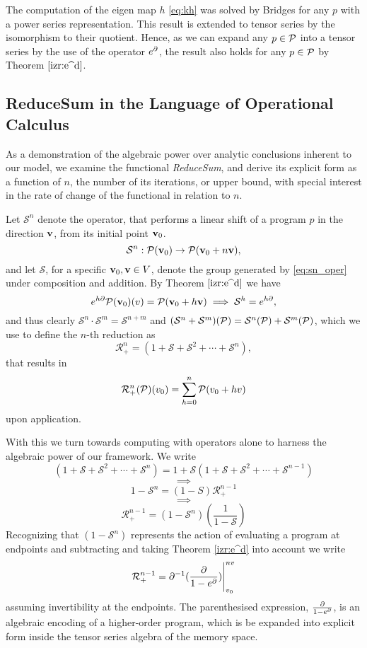 The computation of the eigen map $h$ \eqref{eq:kh} was solved by Bridges \cite{bridges2016solution} for any $p$ with a power series representation. This result is extended to tensor series by the isomorphism to their quotient. Hence, as we can expand any $p\in\mathcal{P}$ into a tensor series by the use of the operator $e^\partial$, the result also holds for any $p\in\mathcal{P}$ by Theorem $\ref{izr:e^d}$. 


\subsection{ReduceSum in the Language of Operational Calculus}

As a demonstration of the algebraic power over analytic conclusions inherent to our model, we examine the functional \emph{ReduceSum}, and derive its explicit form as a function of $n$, the number of its iterations, or upper bound, with special interest in the rate of change of the functional in relation to $n$. 

Let $\mathcal{S}^n$ denote the operator, that performs a linear shift of a program $p$ in the direction $\mathbf{v}$, from its initial point $\mathbf{v}_0$.
   \begin{equation}\label{eq:sn_oper}
   \mathcal{S}^n:\mathcal{P}(\mathbf{v}_0)\to \mathcal{P}(\mathbf{v}_0+n\mathbf{v}),
   \end{equation}  
and let $\mathcal{S}$, for a specific $\mathbf{v}_0, \mathbf{v}\in V$, denote the group generated by \eqref{eq:sn_oper} under composition and addition. By Theorem $\ref{izr:e^d}$ we have
   $$e^{h\partial}\mathcal{P}(\mathbf{v}_0)(v)=\mathcal{P}(\mathbf{v}_0+h\mathbf{v})\implies \mathcal{S}^h=e^{h\partial},$$
and thus clearly $\mathcal{S}^n\cdot\mathcal{S}^m=\mathcal{S}^{n+m}$ and $(\mathcal{S}^n+\mathcal{S}^m)(\mathcal{P})=\mathcal{S}^n(\mathcal{P})+\mathcal{S}^m(\mathcal{P})$, which we use to define the $n$-th reduction as
$$\mathcal{R}_+^n=(1+\mathcal{S}+\mathcal{S}^2+\cdots+\mathcal{S}^n),$$
that results in
   $$\mathcal{R}^n_+(\mathcal{P})(v_0)=\sum\limits_{h=0}^{n}\mathcal{P}(v_0+hv)$$
upon application.

With this we turn towards computing with operators alone to harness the algebraic power of our framework. We write
$$(1+\mathcal{S}+\mathcal{S}^2+\cdots+\mathcal{S}^n)=1+\mathcal{S}(1+\mathcal{S}+\mathcal{S}^2+\cdots+\mathcal{S}^{n-1})$$
   $$\implies$$
   $$1-\mathcal{S}^n=(1-S)\mathcal{R}^{n-1}_+$$
   $$\implies$$
   $$\mathcal{R}^{n-1}_+=(1-\mathcal{S}^n)(\frac{1}{1-\mathcal{S}})$$
Recognizing that $(1-\mathcal{S}^n)$ represents the action of evaluating a program at endpoints and subtracting and taking Theorem \ref{izr:e^d} into account we write
  \begin{equation}
    \mathcal{R}^{n-1}_+=\partial^{-1}(\frac{\partial}{1-e^\partial})\Bigg\vert_{v_0}^{nv}
  \end{equation}
assuming invertibility at the endpoints. The parenthesised expression, $\frac{\partial}{1-e^\partial}$, is an algebraic encoding of a higher-order program, which is be expanded into explicit form inside the tensor series algebra of the memory space.


